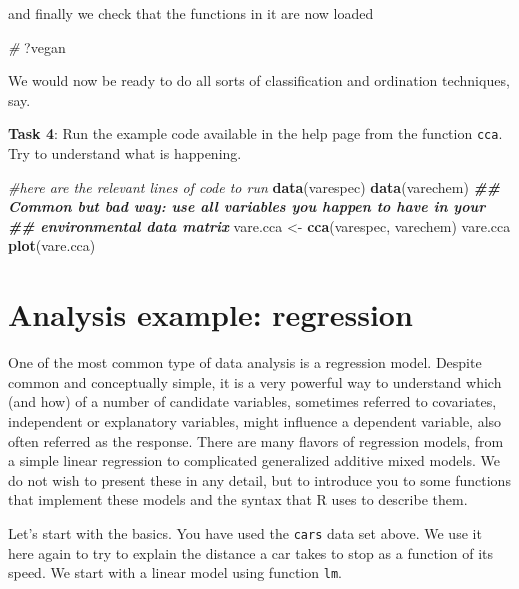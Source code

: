 \documentclass[
]{article}
\newenvironment{Shaded}{\begin{snugshade}}{\end{snugshade}}
\newcommand{\CommentTok}[1]{\textcolor[rgb]{0.56,0.35,0.01}{\textit{#1}}}
\newcommand{\DocumentationTok}[1]{\textcolor[rgb]{0.56,0.35,0.01}{\textbf{\textit{#1}}}}
\newcommand{\FunctionTok}[1]{\textcolor[rgb]{0.13,0.29,0.53}{\textbf{#1}}}
\newcommand{\NormalTok}[1]{#1}
\newcommand{\OtherTok}[1]{\textcolor[rgb]{0.56,0.35,0.01}{#1}}
\begin{document}
and finally we check that the functions in it are now loaded

\begin{Shaded}
\begin{Highlighting}[]
\CommentTok{\#}
\NormalTok{?vegan}
\end{Highlighting}
\end{Shaded}

We would now be ready to do all sorts of classification and ordination
techniques, say.

\textbf{Task 4}: Run the example code available in the help page from
the function \texttt{cca}. Try to understand what is happening.

\begin{Shaded}
\begin{Highlighting}[]
\CommentTok{\#here are the relevant lines of code to run}
\FunctionTok{data}\NormalTok{(varespec)}
\FunctionTok{data}\NormalTok{(varechem)}
\DocumentationTok{\#\# Common but bad way: use all variables you happen to have in your}
\DocumentationTok{\#\# environmental data matrix}
\NormalTok{vare.cca }\OtherTok{\textless{}{-}} \FunctionTok{cca}\NormalTok{(varespec, varechem)}
\NormalTok{vare.cca}
\FunctionTok{plot}\NormalTok{(vare.cca)}
\end{Highlighting}
\end{Shaded}

\section{Analysis example:
regression}\label{analysis-example-regression}

One of the most common type of data analysis is a regression model.
Despite common and conceptually simple, it is a very powerful way to
understand which (and how) of a number of candidate variables, sometimes
referred to covariates, independent or explanatory variables, might
influence a dependent variable, also often referred as the response.
There are many flavors of regression models, from a simple linear
regression to complicated generalized additive mixed models. We do not
wish to present these in any detail, but to introduce you to some
functions that implement these models and the syntax that R uses to
describe them.

Let's start with the basics. You have used the \texttt{cars} data set
above. We use it here again to try to explain the distance a car takes
to stop as a function of its speed. We start with a linear model using
function \texttt{lm}.
\end{document}
